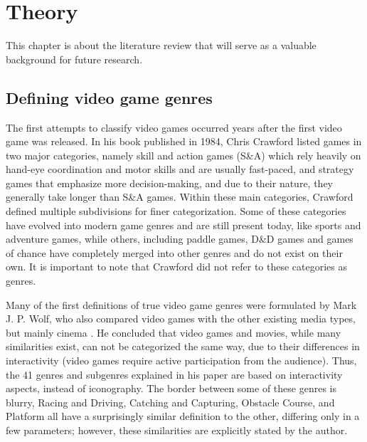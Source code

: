 \chapter{Theory} \label{Chapter:Theory}

This chapter is about the literature review that will serve as a valuable background for future research.



\section{Defining video game genres}

The first attempts to classify video games occurred years after the first video game was released. In his book published in 1984, Chris Crawford listed games in two major categories, namely skill and action games (S\&A) which rely heavily on hand-eye coordination and motor skills and are usually fast-paced, and strategy games that emphasize more decision-making, and due to their nature, they generally take longer than S\&A games\cite{crawford1984art}. Within these main categories, Crawford defined multiple subdivisions for finer categorization. Some of these categories have evolved into modern game genres and are still present today, like sports and adventure games, while others, including paddle games, D\&D games and games of chance have completely merged into other genres and do not exist on their own. It is important to note that Crawford did not refer to these categories as genres.

Many of the first definitions of true video game genres were formulated by Mark J. P. Wolf, who also compared video games with the other existing media types, but mainly cinema \cite{wolf2002genre}. He concluded that video games and movies, while many similarities exist, can not be categorized the same way, due to their differences in interactivity (video games require active participation from the audience). Thus, the 41 genres and subgenres explained in his paper\cite{wolf2002genre} are based on interactivity aspects, instead of iconography. The border between some of these genres is blurry, Racing and Driving, Catching and Capturing, Obstacle Course, and Platform all have a surprisingly similar definition to the other, differing only in a few parameters; however, these similarities are explicitly stated by the author.


